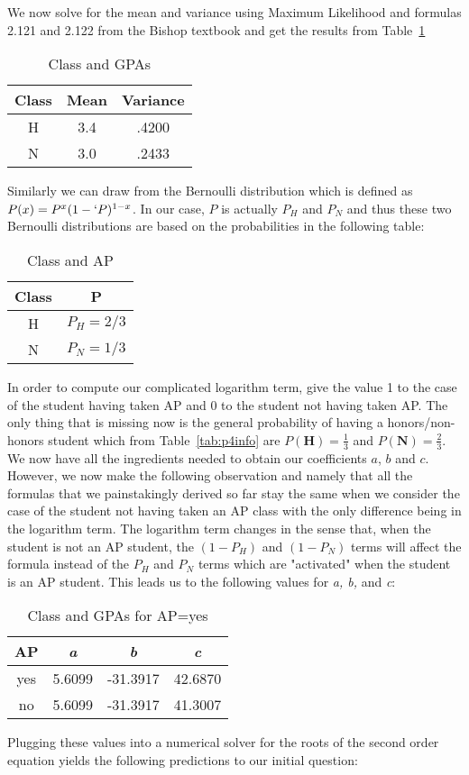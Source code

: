 \documentclass{article}
\begin{document}
We now solve for the mean and variance using Maximum Likelihood and formulas 2.121 and 2.122 from the Bishop textbook and get the results from Table~\ref{tab:p4mlgauss}

\begin{table}[ht]
\centering
\caption{Class and GPAs}\label{tab:p4mlgauss}
\begin{tabular}{|c|c|c|}\hline
Class &  Mean & Variance \\
\hline
H &    3.4 &    .4200 \\   
N&    3.0  &    .2433 \\    
\hline
\end{tabular}
\end{table}


Similarly we can draw from the Bernoulli distribution which is defined as $P(x) = P^x(1-`P)^{1-x}$. In our case, $P$ is actually $P_H$ and $P_N$ and thus these two Bernoulli distributions are based on the probabilities in the following table:

\begin{table}[ht]
\centering
\caption{Class and AP}
\begin{tabular}{|c|c|}\hline
Class &  P  \\
\hline
H &   $P_H=2/3$  \\   
N &    $P_N=1/3$ \\    
\hline
\end{tabular}
\end{table}

In order to compute our complicated logarithm term, give the value 1 to the case of the student having taken AP and 0 to the student not having taken AP. The only thing that is missing now is the general probability of having a honors/non-honors student which from Table~\ref{tab:p4info} are $P(\mathbf{H})=\frac{1}{3}$ and $P(\mathbf{N})=\frac{2}{3}$. We now have all the ingredients needed to obtain our coefficients $a$, $b$ and $c$. However, we now make the following observation and namely that all the formulas that we painstakingly derived so far stay the same when we consider the case of the student not having taken an AP class with the only difference being in the logarithm term. The logarithm term changes in the sense that, when the student is not an AP student, the $(1-P_H)$ and $(1-P_N)$ terms will affect the formula instead of the $P_H$ and $P_N$ terms which are "activated" when the student is an AP student. This leads us to the following values for \textit{a, b, } and \textit{c}:

\begin{table}[ht]
\centering
\caption{Class and GPAs for AP=yes}
\begin{tabular}{|c|c|c|c|}\hline
AP& \textit{a} &  \textit{b} & \textit{c}  \\
\hline
yes &5.6099 & -31.3917 &42.6870\\
no &5.6099 & -31.3917 &41.3007\\
\hline
\end{tabular}
\end{table}
\bigskip
Plugging these values into a numerical solver for the roots of the second order equation yields the following predictions to our initial question:
\end{document}
